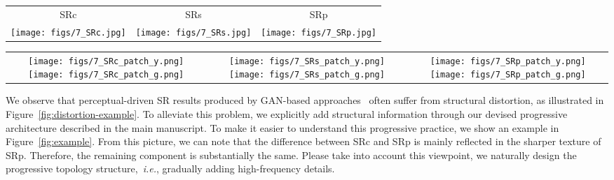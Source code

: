 \documentclass[preprint]{elsarticle}
\newcommand{\ie}{\textit{i.e.}}
\begin{document}
\begin{figure*}[ht]
	\centering
	\begin{tabular}{ccc}
		SRc & SRs & SRp \\
		\texttt{[image: figs/7\_SRc.jpg]} &
		\texttt{[image: figs/7\_SRs.jpg]} &
		\texttt{[image: figs/7\_SRp.jpg]} \\
	\end{tabular}
	\begin{tabular}{ccc}
		\texttt{[image: figs/7\_SRc\_patch\_y.png]} 
		\texttt{[image: figs/7\_SRc\_patch\_g.png]} &
		\texttt{[image: figs/7\_SRs\_patch\_y.png]} 
		\texttt{[image: figs/7\_SRs\_patch\_g.png]} &
		\texttt{[image: figs/7\_SRp\_patch\_y.png]} 
		\texttt{[image: figs/7\_SRp\_patch\_g.png]} \\
	\end{tabular}
	\caption{A comparison of the visual effects between the three branch outputs. SRc, SRs, and SRp are outputs of the COBranch, SOBranch, and POBranch, respectively. The image is from the PIRM\_Val dataset~\cite{PIRM-SR}.}
	\label{fig:example}
\end{figure*}


We observe that perceptual-driven SR results produced by GAN-based approaches~\cite{SRGAN,EnhanceNet,CX} often suffer from structural distortion, as illustrated in Figure~\ref{fig:distortion-example}. To alleviate this problem, we explicitly add structural information through our devised progressive architecture described in the main manuscript. To make it easier to understand this progressive practice, we show an example in Figure~\ref{fig:example}. From this picture, we can note that the difference between SRc and SRp is mainly reflected in the sharper texture of SRp. Therefore, the remaining component is substantially the same. Please take into account this viewpoint, we naturally design the progressive topology structure,~\ie, gradually adding high-frequency details. 
\end{document}
